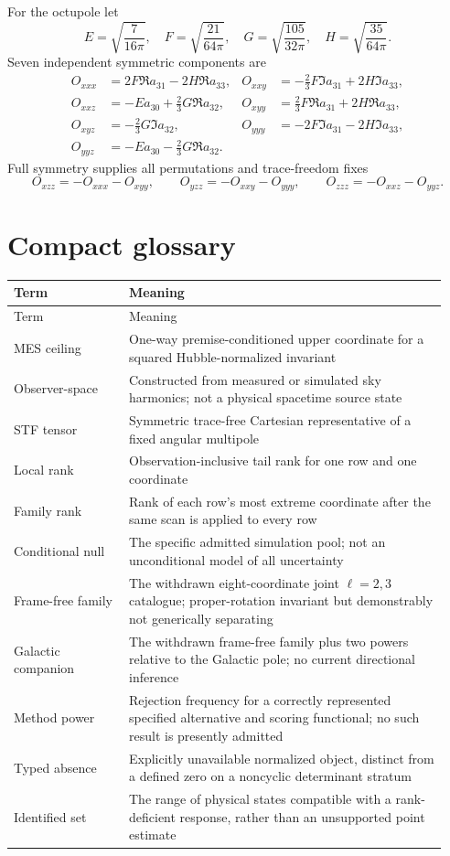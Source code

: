\documentclass[11pt,a4paper]{article}
\begin{document}
For the octupole let
\[
E=\sqrt{\frac{7}{16\pi}},\quad
F=\sqrt{\frac{21}{64\pi}},\quad
G=\sqrt{\frac{105}{32\pi}},\quad
H=\sqrt{\frac{35}{64\pi}}.
\]
Seven independent symmetric components are
\begin{align*}
O_{xxx}&=2F\Re a_{31}-2H\Re a_{33},&
O_{xxy}&=-\tfrac23F\Im a_{31}+2H\Im a_{33},\\
O_{xxz}&=-Ea_{30}+\tfrac23G\Re a_{32},&
O_{xyy}&=\tfrac23F\Re a_{31}+2H\Re a_{33},\\
O_{xyz}&=-\tfrac23G\Im a_{32},&
O_{yyy}&=-2F\Im a_{31}-2H\Im a_{33},\\
O_{yyz}&=-Ea_{30}-\tfrac23G\Re a_{32}.&&
\end{align*}
Full symmetry supplies all permutations and trace-freedom fixes
\[
O_{xzz}=-O_{xxx}-O_{xyy},\qquad
O_{yzz}=-O_{xxy}-O_{yyy},\qquad
O_{zzz}=-O_{xxz}-O_{yyz}.
\]

\section{Compact glossary}

\begin{longtable}{@{}p{0.25\linewidth}p{0.69\linewidth}@{}}
\toprule
Term & Meaning\\
\midrule
\endfirsthead
\toprule
Term & Meaning\\
\midrule
\endhead
MES ceiling & One-way premise-conditioned upper coordinate for a squared
Hubble-normalized invariant\\
Observer-space & Constructed from measured or simulated sky harmonics; not a
physical spacetime source state\\
STF tensor & Symmetric trace-free Cartesian representative of a fixed angular
multipole\\
Local rank & Observation-inclusive tail rank for one row and one coordinate\\
Family rank & Rank of each row's most extreme coordinate after the same scan is
applied to every row\\
Conditional null & The specific admitted simulation pool; not an unconditional
model of all uncertainty\\
Frame-free family & The withdrawn eight-coordinate joint $\ell=2,3$ catalogue;
proper-rotation invariant but demonstrably not generically separating\\
Galactic companion & The withdrawn frame-free family plus two powers relative
to the Galactic pole; no current directional inference\\
Method power & Rejection frequency for a correctly represented specified
alternative and scoring functional; no such result is presently admitted\\
Typed absence & Explicitly unavailable normalized object, distinct from a
defined zero on a noncyclic determinant stratum\\
Identified set & The range of physical states compatible with a rank-deficient
response, rather than an unsupported point estimate\\
\bottomrule
\end{longtable}
\end{document}
